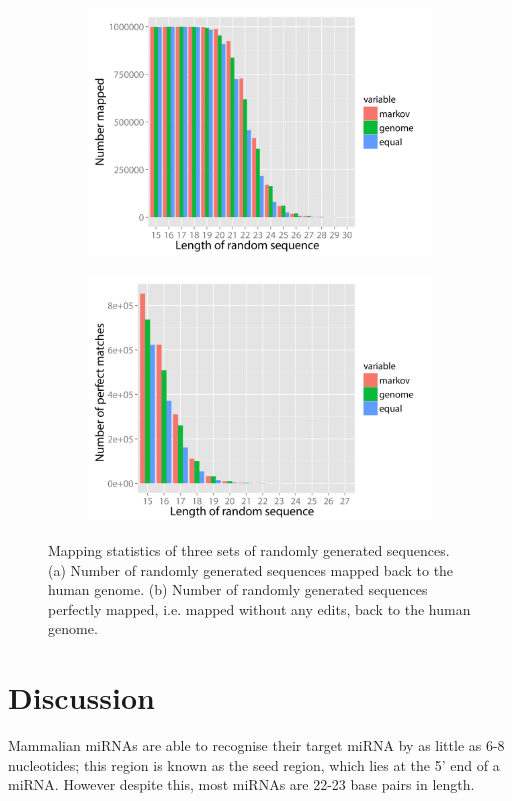 \documentclass{article}
\begin{document}
\begin{figure}
   \centering
   \begin{subfigure}{.5\textwidth}
      \centering
      \includegraphics[width=\textwidth,natwidth=2345,natheight=1692]{mapped.png}
      \caption{}
      \label{fig:mapped}
   \end{subfigure}%
   \begin{subfigure}{.5\textwidth}
      \centering
      \includegraphics[width=\textwidth,natwidth=2345,natheight=1692]{perfectly_mapped.png}
      \caption{}
      \label{fig:perfect_mapped}
   \end{subfigure}
   \caption{Mapping statistics of three sets of randomly generated sequences. (a) Number of randomly generated sequences mapped back to the human genome. (b) Number of randomly generated sequences perfectly mapped, i.e. mapped without any edits, back to the human genome.}
   \label{fig:mapping}
\end{figure}

\section{Discussion}\label{discussion}

Mammalian miRNAs are able to recognise their target miRNA by as little as 6-8 nucleotides; this region is known as the seed region, which lies at the 5' end of a miRNA. However despite this, most miRNAs are 22-23 base pairs in length.



\end{document}
